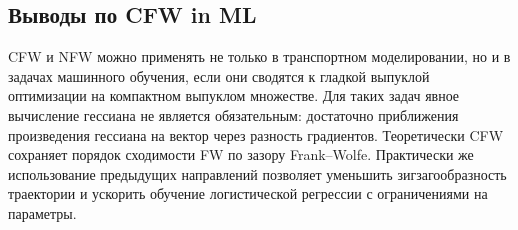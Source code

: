 \subsection{Выводы по CFW in ML}

CFW и NFW можно применять не только в транспортном моделировании, но и в задачах машинного обучения, если они сводятся к гладкой выпуклой оптимизации на компактном выпуклом множестве.
Для таких задач явное вычисление гессиана не является обязательным: достаточно приближения произведения гессиана на вектор через разность градиентов.
Теоретически CFW сохраняет порядок сходимости FW по зазору Frank--Wolfe.
Практически же использование предыдущих направлений позволяет уменьшить зигзагообразность траектории и ускорить обучение логистической регрессии с ограничениями на параметры.
